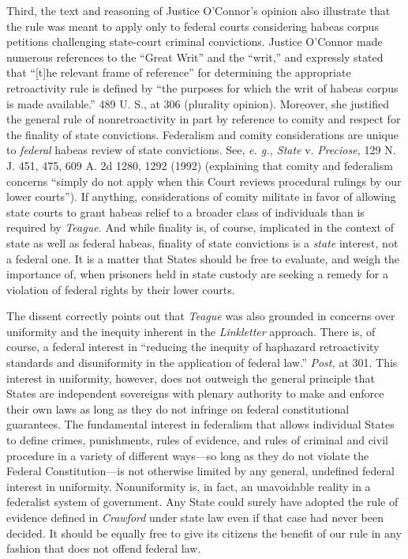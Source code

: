 {{{  Third, the text and reasoning of Justice O'Connor's opinion also
illustrate that the rule was meant to apply only to federal courts
considering habeas corpus petitions challenging state-court criminal
convictions. Justice O'Connor made numerous references to the ``Great
Writ'' and the ``writ,'' and expressly stated that ``[t]he relevant
frame of reference'' for determining the appropriate retroactivity rule
is defined by ``the purposes for which the writ of habeas corpus is
made available.'' 489 U. S., at 306 (plurality opinion). Moreover, she
justified the general rule of nonretroactivity in part by reference to
comity and respect for the finality of state convictions. Federalism and
comity considerations are unique to \emph{federal} habeas review of state
convictions. See, \emph{e. g., State} v. \emph{Preciose,} 129 N. J. 451,
475, 609 A. 2d 1280, 1292 (1992) (explaining that comity and federalism
concerns ``simply do not apply when this Court reviews procedural
rulings by our lower courts''). If anything, considerations of comity
\newpage  militate in favor of allowing state courts to grant habeas
relief to a broader class of individuals than is required by \emph{Teague.}
And while finality is, of course, implicated in the context of state as
well as federal habeas, finality of state convictions is a \emph{state}
interest, not a federal one. It is a matter that States should be free
to evaluate, and weigh the importance of, when prisoners held in state
custody are seeking a remedy for a violation of federal rights by their
lower courts.

  The dissent correctly points out that \emph{Teague} was also grounded in
concerns over uniformity and the inequity inherent in the \emph{Linkletter}
approach. There is, of course, a federal interest in ``reducing the
inequity of haphazard retroactivity standards and disuniformity in the
application of federal law.'' \emph{Post,} at 301. This interest
in uniformity, however, does not outweigh the general principle
that States are independent sovereigns with plenary authority to
make and enforce their own laws as long as they do not infringe
on federal constitutional guarantees. The fundamental interest in
federalism that allows individual States to define crimes, punishments,
rules of evidence, and rules of criminal and civil procedure in
a variety of different ways---so long as they do not violate the
Federal Constitution---is not otherwise limited by any general,
undefined federal interest in uniformity. Nonuniformity is, in fact,
an unavoidable reality in a federalist system of government. Any State
could surely have adopted the rule of evidence defined in \emph{Crawford}
under state law even if that case had never been decided. It should be
equally free to give its citizens the benefit of our rule in any fashion
that does not offend federal law.

}}}
